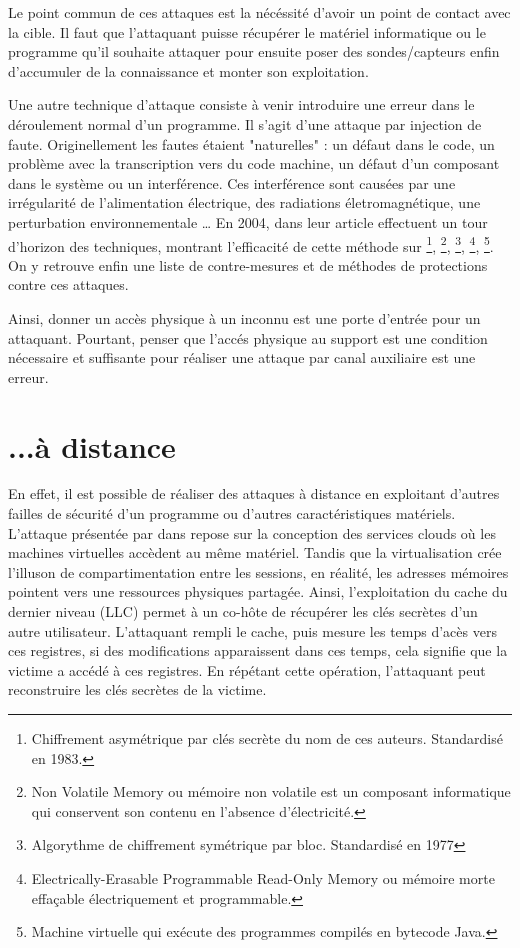 Le point commun de ces attaques est la nécéssité d'avoir un point de contact avec la cible. Il faut que l'attaquant puisse récupérer le matériel informatique ou le programme qu'il souhaite attaquer pour ensuite poser des sondes/capteurs enfin d'accumuler de la connaissance et monter son exploitation.\bigbreak


Une autre technique d'attaque consiste à venir introduire une erreur dans le déroulement normal d'un programme. Il s'agit d'une attaque par injection de faute. Originellement \cite{faultOverview} les fautes étaient "naturelles" : un défaut dans le code, un problème avec la transcription vers du code machine, un défaut d'un composant dans le système ou un interférence. Ces interférence sont causées par une irrégularité de l'alimentation électrique, des radiations életromagnétique, une perturbation environnementale \etc\dots
En 2004, \citeauthor{Fault_Attacks} dans leur article  \cite{Fault_Attacks} effectuent un tour d'horizon des techniques, montrant l'efficacité de cette méthode sur \footnote{Chiffrement asymétrique par clés secrète du nom de ces auteurs. Standardisé en 1983.}, \footnote{Non Volatile Memory ou mémoire non volatile est un composant informatique qui conservent son contenu en l'absence d'électricité.}, \footnote{Algorythme de chiffrement symétrique par bloc. Standardisé en 1977}, \footnote{Electrically-Erasable Programmable Read-Only Memory ou mémoire morte effaçable électriquement et programmable.}, \footnote{Machine virtuelle qui exécute des programmes compilés en bytecode Java.}. On y retrouve enfin une liste de contre-mesures et de méthodes de protections contre ces attaques.\medbreak

Ainsi, donner un accès physique à un inconnu est une porte d'entrée pour un attaquant. Pourtant, penser que l'accés physique au support est une condition nécessaire et suffisante pour réaliser une attaque par canal auxiliaire est une erreur.

\section{...à distance}

En effet, il est possible de réaliser des attaques à distance en exploitant d'autres failles de sécurité d'un programme ou d'autres caractéristiques matériels. L'attaque présentée par \citeauthor{LLC_attack} dans  \cite{LLC_attack} repose sur la conception des services clouds où les machines virtuelles accèdent au même matériel. Tandis que la virtualisation crée l'illuson de compartimentation entre les sessions, en réalité, les adresses mémoires pointent vers une ressources physiques partagée. Ainsi, l'exploitation du cache du dernier niveau (LLC) permet à un co-hôte de récupérer les clés secrètes d'un autre utilisateur. L'attaquant rempli le cache, puis mesure les temps d'acès vers ces registres, si des modifications apparaissent dans ces temps, cela signifie que la victime a accédé à ces registres. En répétant cette opération, l'attaquant peut reconstruire les clés secrètes de la victime.\medbreak


